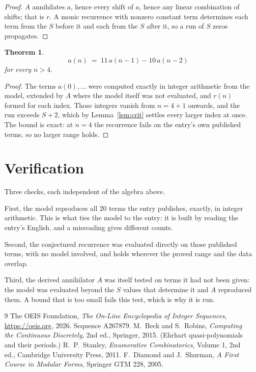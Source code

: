 \documentclass[11pt,a4paper]{article}
\theoremstyle{plain}
\newtheorem{theorem}{Theorem}
\theoremstyle{definition}
\begin{document}
\begin{proof}
$A$ annihilates $a$, hence every shift of $a$, hence any linear combination of shifts; that is
$r$. A monic recurrence with nonzero constant term determines each term from the $S$ before it
and each from the $S$ after it, so a run of $S$ zeros propagates.
\end{proof}

\begin{theorem}
\[
a(n)\;=\;11\,a(n-1) - 10\,a(n-2)
\]
for every $n>4$.
\end{theorem}

\begin{proof}
The terms $a(0),\dots$ were computed exactly in integer arithmetic from the model, extended by
$A$ where the model itself was not evaluated, and $r(n)$ formed for each index. Those integers
vanish from $n=4+1$ onwards, and the run exceeds $S+2$, which by
Lemma~\ref{lem:crit} settles every larger index at once. The bound is exact: at $n=4$ the recurrence fails on the entry's own published terms, so no larger range holds.
\end{proof}

\section{Verification}

Three checks, each independent of the algebra above.

First, the model reproduces all $20$ terms the entry publishes, exactly, in integer
arithmetic. This is what ties the model to the entry: it is built by reading the entry's
English, and a misreading gives different counts.

Second, the conjectured recurrence was evaluated directly on those published terms, with no
model involved, and holds wherever the proved range and the data overlap.

Third, the derived annihilator $A$ was itself tested on terms it had not been given: the model
was evaluated beyond the $S$ values that determine it and $A$ reproduced them. A bound that is
too small fails this test, which is why it is run.

\begin{thebibliography}{9}
 The OEIS Foundation, \emph{The On-Line Encyclopedia of Integer
Sequences}, \url{https://oeis.org}, 2026. Sequence A267879.
 M.~Beck and S.~Robins, \emph{Computing the Continuous Discretely},
2nd ed., Springer, 2015. (Ehrhart quasi-polynomials and their periods.)
 R.~P.~Stanley, \emph{Enumerative Combinatorics}, Volume 1, 2nd ed.,
Cambridge University Press, 2011.
 F.~Diamond and J.~Shurman, \emph{A First Course in Modular Forms},
Springer GTM 228, 2005.
\end{thebibliography}
\end{document}
